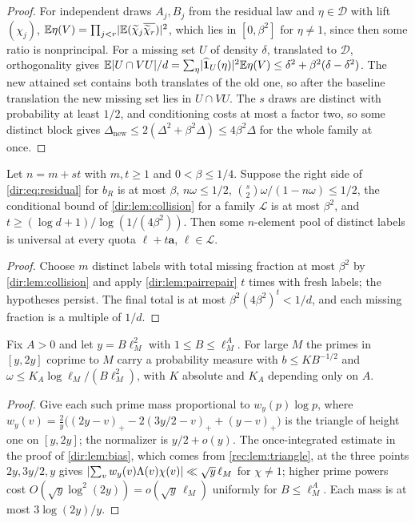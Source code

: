 \begin{proof}
For independent draws $A_j,B_j$ from the residual law and $\eta\in\widehat{\mathcal D}$ with lift
$(\chi_j)$, $\mathbb{E}\eta(V)=\prod_{j<r}\lvert\mathbb{E}(\widetilde\chi_j\overline{\widetilde\chi_r})\rvert^2$, which lies in
$[0,\beta^2]$ for $\eta\ne1$, since then some ratio is nonprincipal. For a missing set $U$ of density
$\delta$, translated to $\mathcal D$, orthogonality gives
$\mathbb{E}\lvert U\cap VU\rvert/d=\sum_\eta\lvert\widehat{\mathbf 1}_U(\eta)\rvert^2\mathbb{E}\eta(V)\le\delta^2+\beta^2(\delta-\delta^2)$.
The new attained set contains both translates of the old one, so after the baseline translation the new
missing set lies in $U\cap VU$. The $s$ draws are distinct with probability at least $1/2$, and
conditioning costs at most a factor two, so some distinct block gives
$\Delta_{\mathrm{new}}\le2(\Delta^2+\beta^2\Delta)\le4\beta^2\Delta$ for the whole family at once.
\end{proof}

\begin{proposition}\label{dir:prop:completion}
Let $n=m+st$ with $m,t\ge1$ and $0<\beta\le1/4$. Suppose the right side of \eqref{dir:eq:residual} for
$b_R$ is at most $\beta$, $n\omega\le1/2$, $\binom s2\omega/(1-n\omega)\le1/2$, the conditional bound of
\cref{dir:lem:collision} for a family $\mathcal L$ is at most $\beta^2$, and
$t\ge(\log d+1)/\log(1/(4\beta^2))$. Then some $n$-element pool of distinct labels is universal at every
quota $\ell+t\mathbf a$, $\ell\in\mathcal L$.
\end{proposition}

\begin{proof}
Choose $m$ distinct labels with total missing fraction at most $\beta^2$ by \cref{dir:lem:collision} and
apply \cref{dir:lem:pairrepair} $t$ times with fresh labels; the hypotheses persist. The final total is
at most $\beta^2(4\beta^2)^t<1/d$, and each missing fraction is a multiple of $1/d$.
\end{proof}

\begin{lemma}\label{dir:lem:dyadic}
Fix $A>0$ and let $y=B\ell_M^2$ with $1\le B\le\ell_M^A$. For large $M$ the primes in $[y,2y]$ coprime to
$M$ carry a probability measure with $b\le KB^{-1/2}$ and $\omega\le K_A\log\ell_M/(B\ell_M^2)$, with $K$
absolute and $K_A$ depending only on $A$.
\end{lemma}

\begin{proof}
Give each such prime mass proportional to $w_y(p)\log p$, where
$w_y(v)=\frac2y\bigl((2y-v)_+-2(3y/2-v)_++(y-v)_+\bigr)$ is the triangle of height one on $[y,2y]$; the
normalizer is $y/2+o(y)$. The once-integrated estimate in the proof of \cref{dir:lem:bias}, which comes
from \cref{rec:lem:triangle}, at the three points $2y,3y/2,y$ gives $\lvert\sum_vw_y(v)\Lambda(v)\chi(v)\rvert\ll\sqrt y\,\ell_M$ for $\chi\ne1$;
higher prime powers cost $O(\sqrt y\log^2(2y))=o(\sqrt y\,\ell_M)$ uniformly for $B\le\ell_M^A$. Each mass is
at most $3\log(2y)/y$.
\end{proof}

